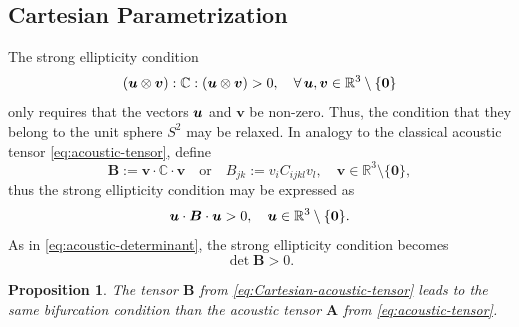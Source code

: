 \documentclass[12pt]{article}
\newcommand{\mbs}[1]{\boldsymbol{#1}}
\newcommand{\mbb}[1]{\mathbb{#1}}
\newtheorem{proposition}{Proposition}
\def\bA{{\mbs{A}}} \def\bB{{\mbs{B}}} \def\bC{{\mbs{C}}}
\def\bv{{\mbs{v}}} \def\bw{{\mbs{w}}} \def\bx{{\mbs{x}}}
\numberwithin{equation}{section}
\begin{document}
\subsection{Cartesian Parametrization}
\label{subsec:Cartesian}

The strong ellipticity condition
\begin{equation}
  (\bu \otimes \bv) : \mbb{C} : (\bu \otimes \bv) > 0,
  \quad
  \forall \, \bu, \bv \in \mbb{R}^3 \setminus \{\mathbf{0}\}
\end{equation}
only requires that the vectors $\bu$ and $\bv$ be non-zero. Thus, the
condition that they belong to the unit sphere $S^2$ may be relaxed. In
analogy to the classical acoustic tensor \eqref{eq:acoustic-tensor},
define
\begin{equation} \label{eq:Cartesian-acoustic-tensor}
  \bB := \bv \cdot \mbb{C} \cdot \bv
  \quad \text{or} \quad
  B_{jk} := v_i C_{ijkl} v_l,
  \quad
  \bv \in \mbb{R}^3 \setminus \{\mathbf{0}\},
\end{equation}
thus the strong ellipticity condition may be expressed as
\begin{equation} \label{eq:Cartesian-acoustic-ellipticity}
  \bu \cdot \bB \cdot \bu > 0,
  \quad
  \bu \in \mbb{R}^3 \setminus \{\mathbf{0}\}.
\end{equation}
As in \eqref{eq:acoustic-determinant}, the strong ellipticity
condition becomes
\begin{equation} \label{Cartesian-acoustic-determinant}
  \det \bB > 0.
\end{equation}

\begin{proposition}
  The tensor $\bB$ from \eqref{eq:Cartesian-acoustic-tensor} leads to
  the same bifurcation condition than the acoustic tensor $\bA$ from
  \eqref{eq:acoustic-tensor}.
\end{proposition}
\end{document}
